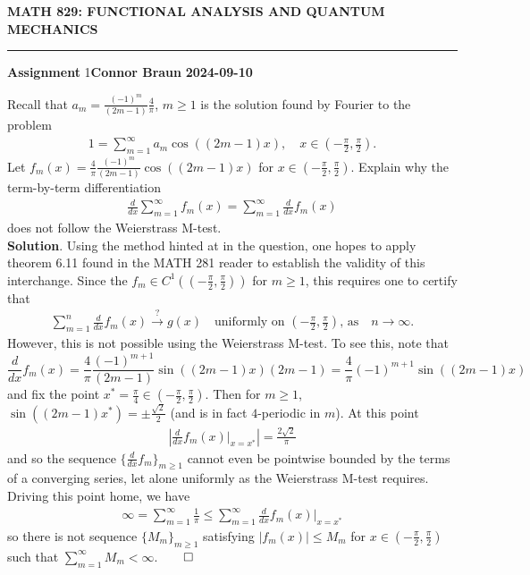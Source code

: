 \documentclass[10pt]{article}
\newcommand{\1}[1]{\mathbbm{1}_{#1}}
\begin{document}
    \begin{center}
        {\bf\large{MATH 829: FUNCTIONAL ANALYSIS AND QUANTUM MECHANICS}}
        \smallskip
        \hrule
        \smallskip
        {\bf Assignment} 1\hfill {\bf Connor Braun} \hfill {\bf 2024-09-10}
    \end{center}
    \vspace{5pt}
     Recall that $a_m=\tfrac{(-1)^m}{(2m-1)}\tfrac{4}{\pi}$, $m\geq 1$ is the solution found by Fourier to the problem
    \begin{align*}
        1=\sum_{m=1}^\infty a_m\cos((2m-1)x),\quad x\in(-\tfrac{\pi}{2},\tfrac{\pi}{2}).
    \end{align*}
    Let $f_m(x)=\tfrac{4}{\pi}\tfrac{(-1)^m}{(2m-1)}\cos((2m-1)x)$ for $x\in(-\tfrac{\pi}{2},\tfrac{\pi}{2})$. Explain why the term-by-term differentiation
    \begin{align*}
        \frac{d}{dx}\sum_{m=1}^\infty f_m(x)=\sum_{m=1}^\infty\frac{d}{dx}f_m(x)
    \end{align*}
    does not follow the Weierstrass M-test.\\[5pt]
    {\bf Solution}. Using the method hinted at in the question, one hopes to apply theorem 6.11 found in the MATH 281 reader to establish the validity of this interchange.
    Since the $f_m\in C^1((-\tfrac{\pi}{2},\tfrac{\pi}{2}))$ for $m\geq 1$, this requires one to certify that
    \begin{align*}
        \sum_{m=1}^n\frac{d}{dx}f_m(x)\overset{?}{\rightarrow} g(x)\quad\text{uniformly on $(-\tfrac{\pi}{2},\tfrac{\pi}{2})$, as}\quad n\rightarrow\infty.
    \end{align*}
    However, this is not possible using the Weierstrass M-test. To see this, note that
    \[\frac{d}{dx}f_m(x)=\frac{4}{\pi}\frac{(-1)^{m+1}}{(2m-1)}\sin((2m-1)x)(2m-1)=\frac{4}{\pi}(-1)^{m+1}\sin((2m-1)x)\]
    and fix the point $x^\ast=\tfrac{\pi}{4}\in(-\tfrac{\pi}{2},\tfrac{\pi}{2})$. Then for $m\geq 1$, $\sin((2m-1)x^\ast)=\pm\tfrac{\sqrt{2}}{2}$ (and is in fact $4$-periodic in $m$). At this point
    \begin{align*}
        \left|\frac{d}{dx}f_m(x)\big|_{x=x^\ast}\right|=\frac{2\sqrt{2}}{\pi}
    \end{align*}
    and so the sequence $\{\tfrac{d}{dx}f_m\}_{m\geq 1}$ cannot even be pointwise bounded by the terms of a converging series, let alone uniformly as
    the Weierstrass M-test requires. Driving this point home, we have
    \begin{align*}
        \infty=\sum_{m=1}^\infty\frac{1}{\pi}\leq \sum_{m=1}^\infty\frac{d}{dx}f_m(x)\big|_{x=x^\ast}
    \end{align*}
    so there is not sequence $\{M_m\}_{m\geq 1}$ satisfying $|f_m(x)|\leq M_m$ for $x\in(-\tfrac{\pi}{2},\tfrac{\pi}{2})$ such that $\sum_{m=1}^\infty M_m<\infty$.\hfill{$\qed$}\\[5pt]
\end{document}
